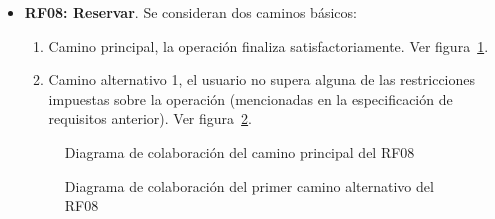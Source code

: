 \begin{itemize}
	\FloatBarrier
	\item \textbf{RF08: Reservar}. Se consideran dos caminos básicos: 
	\begin{enumerate}
		\item Camino principal, la operación finaliza satisfactoriamente. Ver figura~\ref{fig:diagramaColaboracion_RF08_1}.
		\item Camino alternativo 1, el usuario no supera alguna de las restricciones impuestas sobre la operación (mencionadas en la especificación de requisitos anterior). Ver figura~\ref{fig:diagramaColaboracion_RF08_2}.
	\end{enumerate}
	\begin{figure} [!htb]
		\centering
		\caption{Diagrama de colaboración del camino principal del RF08}
		\label{fig:diagramaColaboracion_RF08_1}
	\end{figure}
	\begin{figure} [!htb]
		\centering
		\caption{Diagrama de colaboración del primer camino alternativo del RF08}
		\label{fig:diagramaColaboracion_RF08_2}
	\end{figure}
	

\end{itemize}
